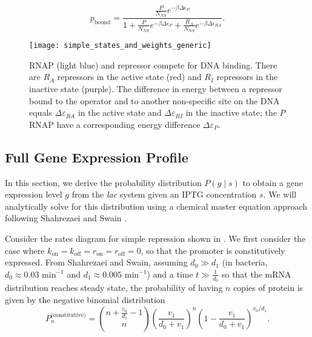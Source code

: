\begin{equation} \label{eqRNAPboundEquilibrium}
	p_\text{bound} = \frac{ \frac{P}{N_{NS}} e^{-\beta \Delta \epsilon_P} }{1 + \frac{P}{N_{NS}} e^{-\beta \Delta \epsilon_P} + \frac{R_A}{N_{NS}} e^{-\beta \Delta \epsilon_{RA}}}.
\end{equation}

\begin{figure}[h!]
	\centering \texttt{[image: simple\_states\_and\_weights\_generic]} 
	\caption{ RNAP (light
		blue) and repressor compete for DNA binding. There are $R_A$ repressors in the
		active state (red) and $R_I$ repressors in the inactive state (purple). The
		difference in energy between a repressor bound to the operator and to another
		non-specific site on the DNA equals $\Delta\varepsilon_{RA}$ in the active
		state and $\Delta\varepsilon_{RI}$ in the inactive state; the $P$ RNAP have a
		corresponding energy difference $\Delta\varepsilon_{P}$. }
	\label{figRepressorStatesWeights}
\end{figure}

\subsection{Full Gene Expression Profile} \label{sectionGeneExpressionDistribution}

In this section, we derive the probability distribution $P(g \mid s)$ to obtain
a gene expression level $g$ from the \textit{lac} system given an IPTG
concentration $s$. We will analytically solve for this distribution using a
chemical master equation approach following Shahrezaei and Swain
\cite{Shahrezaei2008}.

Consider the rates diagram for simple repression shown in
\fref[figRatesDiagram]. We first consider the case where $k_\text{on} =
k_\text{off} = r_\text{on} = r_\text{off} = 0$, so that the promoter is
constitutively expressed. From Shahrezaei and Swain, assuming $d_0 \gg d_1$ (in
bacteria, $d_0 \approx 0.03\,\,\text{min}^{-1}$ and $d_1 \approx
0.005\,\,\text{min}^{-1}$) and a time $t \gg \frac{1}{d_0}$ so that the mRNA
distribution reaches steady state, the probability of having $n$ copies of
protein is given by the negative binomial distribution \cite{Shahrezaei2008}
\begin{equation} \label{eqGeneExpressionDistributionConstitutive}
	P_n^\text{(constitutive)} = \binom{n + \frac{v_0}{d_1} - 1}{n} \left( \frac{v_1}{d_0 + v_1} \right)^{n} \left( 1 - \frac{v_1}{d_0 + v_1} \right)^{v_0/d_1}.
\end{equation}

